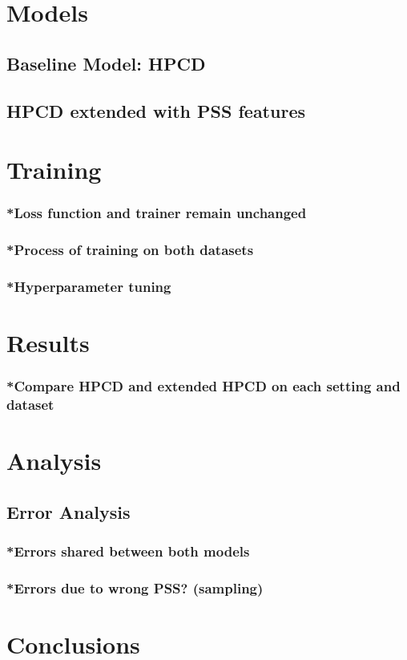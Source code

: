 \section{Models}
\subsection{Baseline Model: HPCD}
\subsection{HPCD extended with PSS features}

\section{Training}
\subsubsection{*Loss function and trainer remain unchanged}
\subsubsection{*Process of training on both datasets}
\subsubsection{*Hyperparameter tuning}

\section{Results}
\subsubsection{*Compare HPCD and extended HPCD on each setting and dataset}

\section{Analysis}
\subsection{Error Analysis}
\subsubsection{*Errors shared between both models}
\subsubsection{*Errors due to wrong PSS? (sampling)}

\section{Conclusions}
